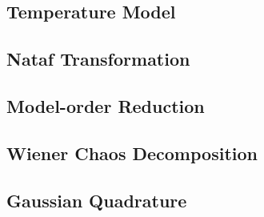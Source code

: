 \subsection{Temperature Model} 

\subsection{Nataf Transformation} 

\subsection{Model-order Reduction} 

\subsection{Wiener Chaos Decomposition} 


\subsection{Gaussian Quadrature} 
